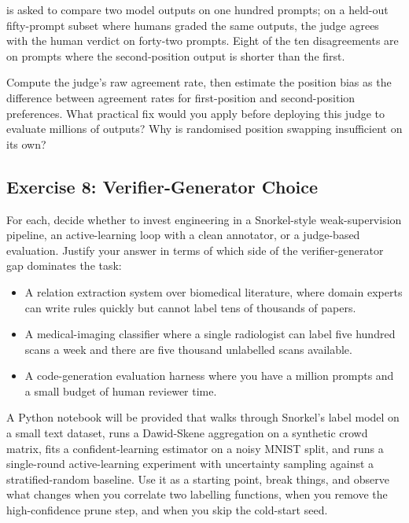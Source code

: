  is asked to compare two model outputs on one hundred prompts; on a held-out fifty-prompt subset where humans graded the same outputs, the judge agrees with the human verdict on forty-two prompts. Eight of the ten disagreements are on prompts where the second-position output is shorter than the first.

 Compute the judge's raw agreement rate, then estimate the position bias as the difference between agreement rates for first-position and second-position preferences. What practical fix would you apply before deploying this judge to evaluate millions of outputs? Why is randomised position swapping insufficient on its own?

\subsection{Exercise 8: Verifier-Generator Choice}

 For each, decide whether to invest engineering in a Snorkel-style weak-supervision pipeline, an active-learning loop with a clean annotator, or a judge-based evaluation. Justify your answer in terms of which side of the verifier-generator gap dominates the task:
\begin{itemize}
    \item A relation extraction system over biomedical literature, where domain experts can write rules quickly but cannot label tens of thousands of papers.
    \item A medical-imaging classifier where a single radiologist can label five hundred scans a week and there are five thousand unlabelled scans available.
    \item A code-generation evaluation harness where you have a million prompts and a small budget of human reviewer time.
\end{itemize}

 A Python notebook will be provided that walks through Snorkel's label model on a small text dataset, runs a Dawid-Skene aggregation on a synthetic crowd matrix, fits a confident-learning estimator on a noisy MNIST split, and runs a single-round active-learning experiment with uncertainty sampling against a stratified-random baseline. Use it as a starting point, break things, and observe what changes when you correlate two labelling functions, when you remove the high-confidence prune step, and when you skip the cold-start seed.

